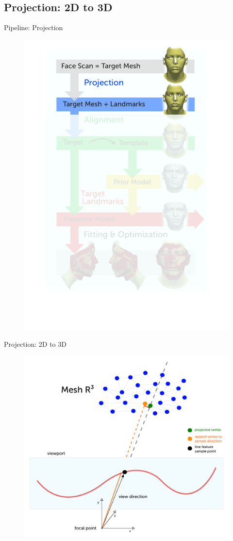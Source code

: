 \documentclass[xcolor=x11names,compress]{beamer}
\begin{document}
    \subsection{Projection: 2D to 3D}
    \begin{frame}{Pipeline: Projection}
        \begin{figure}   
            \centering
            \includegraphics[width=.6\textwidth]{../resources/figures/pipeline_projection.pdf}
        \end{figure}
    \end{frame}

    \begin{frame}{Projection: 2D to 3D}
        \begin{figure}
            \centering
            \includegraphics[width=.8\textwidth]{../resources/figures/projection.pdf}
        \end{figure}
    \end{frame}
\end{document}
